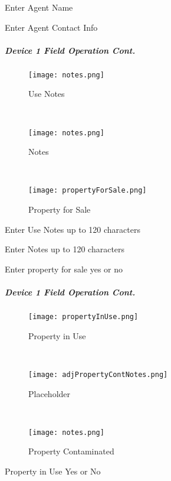 \noindent Enter Agent Name
\vspace{2.5in}

\noindent Enter Agent Contact Info
\clearpage
\subparagraph*{Device 1 Field Operation Cont.}
\begin{wrapfigure}{r}{0.4\textwidth}
\centering
    \texttt{[image: notes.png]}
\caption {Use Notes}
\vspace{.1in}

\HRule \\[.4cm] %
\vspace{.1in}

    \texttt{[image: notes.png]}
\caption{Notes}
\vspace{.1in}

\HRule \\[.4cm] %
\vspace{.1in}

    \texttt{[image: propertyForSale.png]}
\caption{Property for Sale}
\end{wrapfigure}
Enter  Use Notes up to 120 characters
\vspace{2in}

\noindent Enter Notes up to 120 characters
\vspace{2.5in}

\noindent Enter property for sale yes or no
\clearpage
\subparagraph*{Device 1 Field Operation Cont.}
\begin{wrapfigure}{r}{0.4\textwidth}
\centering
    \texttt{[image: propertyInUse.png]}
\caption {Property in Use}
\vspace{.1in}

\HRule \\[.4cm] %
\vspace{.1in}

    \texttt{[image: adjPropertyContNotes.png]}
\caption{Placeholder}
\vspace{.1in}

\HRule \\[.4cm] %
\vspace{.1in}

    \texttt{[image: notes.png]}
\caption{Property Contaminated}
\end{wrapfigure}
Property in Use Yes or No
\vspace{2.5in}

